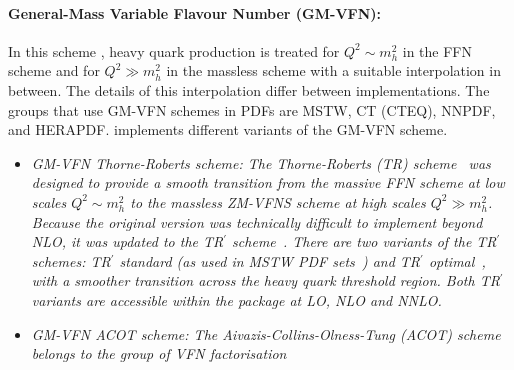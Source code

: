 \paragraph{General-Mass Variable Flavour Number (GM-VFN)\rm:\\}
In this scheme \cite{VFN}, heavy quark production is treated for
$Q^2 \sim m_h^2$ in the FFN scheme and for $Q^2 \gg m_h^2$
in the massless scheme with a suitable interpolation in between. 
The details of this interpolation differ between implementations.
The groups that use GM-VFN schemes in PDFs are MSTW, CT (CTEQ), NNPDF, and HERAPDF.
\fitter implements different variants of the GM-VFN scheme.
% 
\begin{itemize}
%
\item \it {GM-VFN Thorne-Roberts scheme:} \rm
%
%
The Thorne-Roberts (TR) scheme~\cite{Thorne:1997ga} was designed to provide a smooth transition 
from the massive FFN scheme at low scales $Q^2 \sim m_h^2$ to the massless ZM-VFNS scheme at high scales $Q^2 \gg m_h^2$. 
Because the original version was technically difficult to implement beyond NLO, it was updated 
to the TR$^\prime$ scheme~\cite{Thorne:2006qt}.
There are two variants of the TR$^\prime$ schemes: TR$^\prime$ standard (as used in MSTW PDF sets~\cite{Thorne:2006qt,MSTWpdf}) 
and TR$^\prime$ optimal~\cite{Thorne:6180}, with a smoother transition across the heavy quark threshold region. 
Both TR$^\prime$ variants are accessible within the \fitter package at LO, NLO and NNLO.
\vspace{0.1cm}
\item \it {GM-VFN ACOT scheme:} \rm
The Aivazis-Collins-Olness-Tung (ACOT) scheme belongs to the group of VFN factorisation 

\end{itemize}
